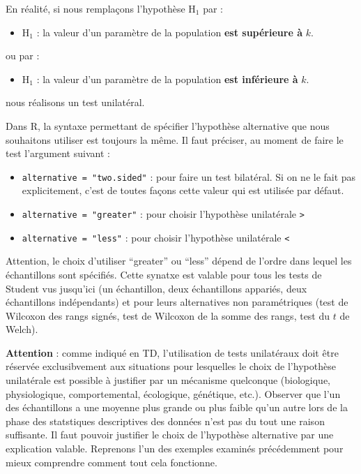 \documentclass[a4paperpaper,]{article}
\providecommand{\tightlist}{%
  \setlength{\itemsep}{0pt}\setlength{\parskip}{0pt}}
\begin{document}
En réalité, si nous remplaçons l'hypothèse H\(_1\) par :

\begin{itemize}
\tightlist
\item
  H\(_1\) : la valeur d'un paramètre de la population \textbf{est supérieure à} \(k\).
\end{itemize}

ou par :

\begin{itemize}
\tightlist
\item
  H\(_1\) : la valeur d'un paramètre de la population \textbf{est inférieure à} \(k\).
\end{itemize}

nous réalisons un test unilatéral.

Dans R, la syntaxe permettant de spécifier l'hypothèse alternative que nous souhaitons utiliser est toujours la même. Il faut préciser, au moment de faire le test l'argument suivant :

\begin{itemize}
\tightlist
\item
  \texttt{alternative\ =\ "two.sided"} : pour faire un test bilatéral. Si on ne le fait pas explicitement, c'est de toutes façons cette valeur qui est utilisée par défaut.
\item
  \texttt{alternative\ =\ "greater"} : pour choisir l'hypothèse unilatérale \texttt{\textgreater{}}
\item
  \texttt{alternative\ =\ "less"} : pour choisir l'hypothèse unilatérale \texttt{\textless{}}
\end{itemize}

Attention, le choix d'utiliser ``greater'' ou ``less'' dépend de l'ordre dans lequel les échantillons sont spécifiés. Cette synatxe est valable pour tous les tests de Student vus jusqu'ici (un échantillon, deux échantillons appariés, deux échantillons indépendants) et pour leurs alternatives non paramétriques (test de Wilcoxon des rangs signés, test de Wilcoxon de la somme des rangs, test du \(t\) de Welch).

\textbf{Attention} : comme indiqué en TD, l'utilisation de tests unilatéraux doit être réservée exclusibvement aux situations pour lesquelles le choix de l'hypothèse unilatérale est possible à justifier par un mécanisme quelconque (biologique, physiologique, comportemental, écologique, génétique, etc.). Observer que l'un des échantillons a une moyenne plus grande ou plus faible qu'un autre lors de la phase des statstiques descriptives des données n'est pas du tout une raison suffisante. Il faut pouvoir justifier le choix de l'hypothèse alternative par une explication valable. Reprenons l'un des exemples examinés précédemment pour mieux comprendre comment tout cela fonctionne.
\end{document}
